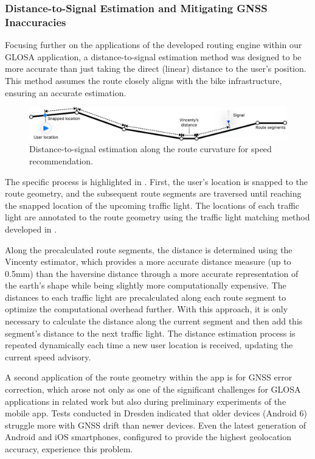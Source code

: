 \subsubsection{Distance-to-Signal Estimation and Mitigating GNSS Inaccuracies}

Focusing further on the applications of the developed routing engine within our GLOSA application, a distance-to-signal estimation method was designed to be more accurate than just taking the direct (linear) distance to the user's position. This method assumes the route closely aligns with the bike infrastructure, ensuring an accurate estimation.

\begin{figure}[t]
\centering
\includegraphics[width=\linewidth]{images/distance-to-signal-estimation.pdf}
\caption{Distance-to-signal estimation along the route curvature for speed recommendation.}
\label{fig:distance-to-signal-estimation}
\end{figure}

The specific process is highlighted in . First, the user's location is snapped to the route geometry, and the subsequent route segments are traversed until reaching the snapped location of the upcoming traffic light. The locations of each traffic light are annotated to the route geometry using the traffic light matching method developed in .

Along the precalculated route segments, the distance is determined using the Vincenty estimator, which provides a more accurate distance measure (up to 0.5mm) than the haversine distance through a more accurate representation of the earth's shape while being slightly more computationally expensive. The distances to each traffic light are precalculated along each route segment to optimize the computational overhead further. With this approach, it is only necessary to calculate the distance along the current segment and then add this segment's distance to the next traffic light. The distance estimation process is repeated dynamically each time a new user location is received, updating the current speed advisory.

A second application of the route geometry within the app is for GNSS error correction, which arose not only as one of the significant challenges for GLOSA applications in related work but also during preliminary experiments of the mobile app. Tests conducted in Dresden indicated that older devices (Android 6) struggle more with GNSS drift than newer devices. Even the latest generation of Android and iOS smartphones, configured to provide the highest geolocation accuracy, experience this problem.

